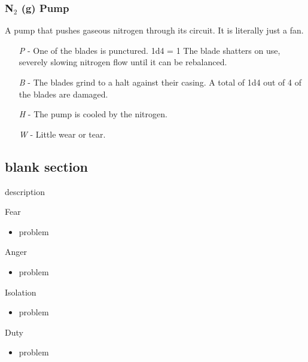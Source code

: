 \documentclass[a4paper]{article}
\begin{document}
\vspace{-0.5cm} \hspace{-18pt} \subsubsection{N$_2$ (g) Pump} \label{thermal_n2_pump} \vspace{-0.2cm}
A pump that pushes gaseous nitrogen through its circuit. It is literally just a fan.
\begin{enumerate}
\item [\textit{P}] - One of the blades is punctured. \newline \hspace*{3pt} 1d4 = 1 The blade shatters on use, severely slowing nitrogen flow until it can be rebalanced.
\item [\textit{B}] - The blades grind to a halt against their casing. A total of 1d4 out of 4 of the blades are damaged.
\item [\textit{H}] - The pump is cooled by the nitrogen.
\item [\textit{W}] - Little wear or tear.
\end{enumerate}


\subsection{blank section} \label{blank}

description

\vspace{0.3cm}
\begin{minipage}[t]{0.4\linewidth}
Fear
\begin{itemize}
\item problem
\end{itemize}
\end{minipage} 
\begin{minipage}[t]{0.4\linewidth}
Anger
\begin{itemize}
\item problem
\end{itemize}
\end{minipage}

\begin{minipage}[t]{0.4\linewidth}
Isolation
\begin{itemize}
\item problem
\end{itemize}
\end{minipage}
\begin{minipage}[t]{0.4\linewidth}
Duty
\begin{itemize}
\item problem
\end{itemize}
\end{minipage}
\end{document}
